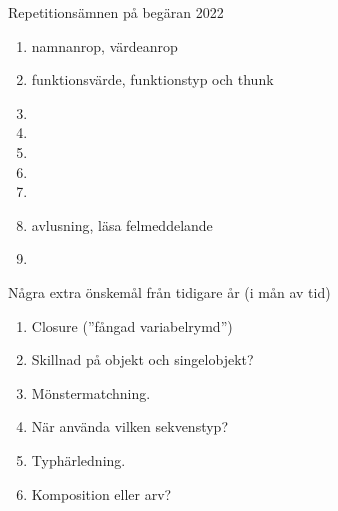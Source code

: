 
\begin{Slide}{Repetitionsämnen på begäran 2022}
\begin{enumerate}\SlideFontSmall
   \item namnanrop, värdeanrop 
   \item funktionsvärde, funktionstyp och thunk 
   \item {} 
   \item {} 
   \item {} 
   \item {} 
   \item {} 
   \item avlusning, läsa felmeddelande 
   \item {} 
\end{enumerate}  
\end{Slide}

\begin{Slide}{Några extra önskemål från tidigare år (i mån av tid)}
\begin{enumerate}\SlideFontSmall
  \item Closure (''fångad variabelrymd'') 
  \item Skillnad på objekt och singelobjekt? 
  \item Mönstermatchning. 
  \item När använda vilken sekvenstyp? 
  \item Typhärledning. 
  \item Komposition eller arv?  
\end{enumerate}  
\end{Slide}


